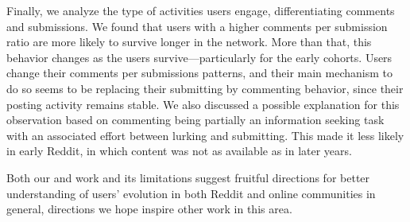 Finally, we analyze the type of activities users engage, differentiating comments and submissions. 
We found that users with a higher comments per submission ratio are more likely to survive longer in the network. More than that, this behavior changes as the users survive---particularly for the early cohorts. Users change their comments per submissions patterns, and their main mechanism to do so seems to be replacing their submitting by commenting behavior, since their posting activity remains stable.
We also discussed a possible explanation for this observation based on commenting being partially an information seeking task with an associated effort between lurking and submitting. This made it less likely in early Reddit, in which content was not as available as in later years.

Both our and work and its limitations suggest fruitful directions for better understanding of users' evolution in both Reddit and online communities in general, directions we hope inspire other work in this area.  



%



